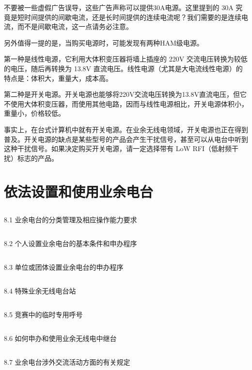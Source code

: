 \documentclass[12pt,UTF8]{ctexbook}
\begin{document}
不要被一些虚假广告误导，这些广告声称可以提供30A电源。这里提到的 30A 究竟是短时间提供的间歇电流，还是长时间提供的连续电流呢？我们需要的是连续电流，而不是间歇电流，这一点请务必注意。

另外值得一提的是，当购买电源时，可能发现有两种HAM级电源。

第一种是线性电源，它利用大体积变压器将墙上插座的 220V 交流电压转换为较低的电压，随后再转换为 13.8V 直流电压。线性电源（尤其是大电流线性电源）的特点是：体积大，重量大，成本高。

第二种是开关电源。开关电源也能够将220V交流电压转换为13.8V直流电压，但它不使用大体积变压器，而使用其他电路，因而与线性电源相比，开关电源体积小，重量小，价格较低。

事实上，在台式计算机中就有开关电源。在业余无线电领域，开关电源也正在得到普及。开关电源的缺点是某些型号的产品会产生干扰信号，甚至可以从电台中听到这种干扰信号。如果决定购买开关电源，请一定选择带有 LoW RFI（低射频干扰）标志的产品。

\chapter{依法设置和使用业余电台}

\section{}8.1 业余电台的分类管理及相应操作能力要求
\section{}8.2 个人设置业余电台的基本条件和申办程序
\section{}8.3 单位或团体设置业余电台的申办程序
\section{}8.4 特殊业余无线电台站
\section{}8.5 竞赛中的临时专用呼号
\section{}8.6 如何申办和使用业余无线电中继台
\section{}8.7 业余电台涉外交流活动方面的有关规定
\end{document}
